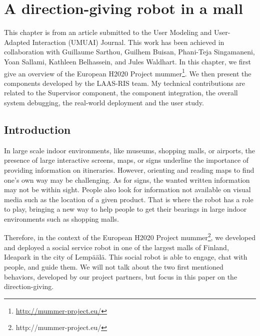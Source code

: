 \documentclass[a4paper,11pt,twoside]{StyleThese}
\begin{document}
\setcounter{chapter}{2} %
\dominitoc
\faketableofcontents
\fi

\chapter{A direction-giving robot in a mall}
\label{chapter:chap3}
\minitoc

This chapter is from an article submitted to the  User Modeling and User-Adapted Interaction (UMUAI) Journal. This work has been achieved in collaboration with Guillaume Sarthou, Guilhem Buisan, Phani-Teja Singamaneni, Yoan Sallami, Kathleen Belhassein, and Jules Waldhart. In this chapter, we first give an overview of the European H2020 Project \acrfull{mummer}\footnote{\url{http://mummer-project.eu/}}. We then present the components developed by the LAAS-RIS team. My technical contributions are related to the Supervisor component, the component integration, the overall system debugging, the real-world deployment and the user study.

\section{Introduction}

In large scale indoor environments, like museums, shopping malls, or airports, the presence of large interactive screens, maps, or signs underline the importance of providing information on itineraries. However, orienting and reading maps to find one's own way may be challenging. As for signs, the wanted written information may not be within sight. People also look for information not available on visual media such as the location of a given product. That is where the robot has a role to play, bringing a new way to help people to get their bearings in large indoor environments such as shopping malls.

Therefore, in the context of the European H2020 Project \acrshort{mummer}\footnote{http://mummer-project.eu/}, we developed and deployed a social service robot in one of the largest malls of Finland, Ideapark in the city of Lemp\"a\"al\"a. This social robot is able to engage, chat with people, and guide them. We will not talk about the two first mentioned behaviors, developed by our project partners, but focus in this paper on the direction-giving.
\end{document}
